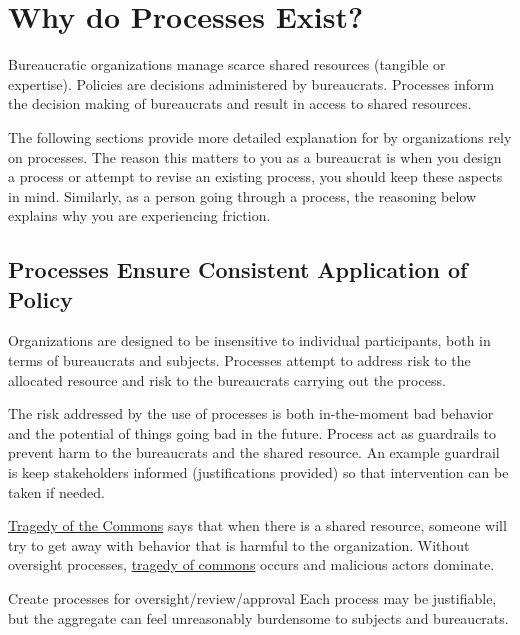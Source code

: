 \section{Why do Processes Exist?}

Bureaucratic organizations manage scarce shared resources (tangible or expertise). Policies are decisions administered by bureaucrats. Processes inform the decision making of bureaucrats and result in access to shared resources. 

The following sections provide more detailed explanation for by organizations rely on processes. The reason this matters to you as a bureaucrat is when you design a process or attempt to revise an existing process, you should keep these aspects in mind. Similarly, as a person going through a process, the reasoning below explains why you are experiencing friction. 

\subsection*{Processes Ensure Consistent Application of Policy}

Organizations are designed to be insensitive to individual participants, both in terms of bureaucrats and subjects. Processes attempt to address risk to the allocated resource and risk to the bureaucrats carrying out the process.

The risk addressed by the use of processes is both in-the-moment bad behavior and the potential of things going bad in the future. Process act as guardrails to prevent harm to the bureaucrats and the shared resource. An example guardrail is keep stakeholders informed (justifications provided) so that intervention can be taken if needed. 

\href{https://en.wikipedia.org/wiki/Tragedy_of_the_commons}{Tragedy of the Commons} says that when there is a shared resource, someone will try to get away with behavior that is harmful to the organization.
Without oversight processes, \href{https://en.wikipedia.org/wiki/Tragedy_of_the_commons}{tragedy of commons} occurs and malicious actors dominate.


Create processes for oversight/review/approval
Each process may be justifiable, but the aggregate can feel unreasonably burdensome to subjects and bureaucrats.





